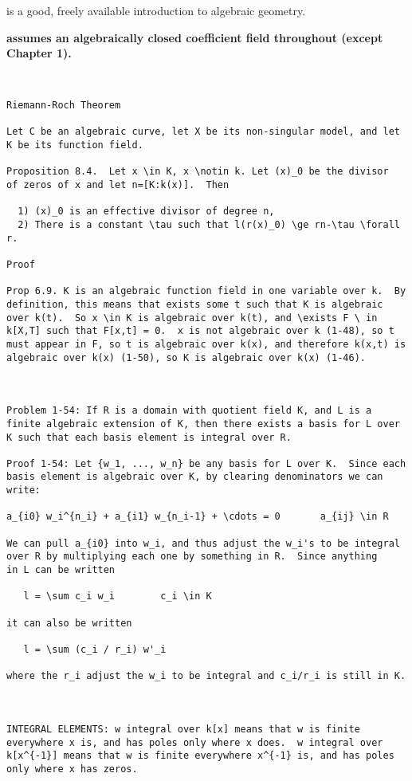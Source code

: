 \vfill\eject
{}

\cite{fulton} is a good, freely available introduction to algebraic geometry.

{\bf \cite{fulton} assumes an algebraically closed coefficient field throughout
(except Chapter 1).}

{\small\begin{verbatim}


Riemann-Roch Theorem

Let C be an algebraic curve, let X be its non-singular model, and let
K be its function field.

Proposition 8.4.  Let x \in K, x \notin k. Let (x)_0 be the divisor
of zeros of x and let n=[K:k(x)].  Then

  1) (x)_0 is an effective divisor of degree n,
  2) There is a constant \tau such that l(r(x)_0) \ge rn-\tau \forall r.

Proof

Prop 6.9. K is an algebraic function field in one variable over k.  By
definition, this means that exists some t such that K is algebraic
over k(t).  So x \in K is algebraic over k(t), and \exists F \ in
k[X,T] such that F[x,t] = 0.  x is not algebraic over k (1-48), so t
must appear in F, so t is algebraic over k(x), and therefore k(x,t) is
algebraic over k(x) (1-50), so K is algebraic over k(x) (1-46).



Problem 1-54: If R is a domain with quotient field K, and L is a
finite algebraic extension of K, then there exists a basis for L over
K such that each basis element is integral over R.

Proof 1-54: Let {w_1, ..., w_n} be any basis for L over K.  Since each
basis element is algebraic over K, by clearing denominators we can
write:

a_{i0} w_i^{n_i} + a_{i1} w_{n_i-1} + \cdots = 0       a_{ij} \in R

We can pull a_{i0} into w_i, and thus adjust the w_i's to be integral
over R by multiplying each one by something in R.  Since anything
in L can be written

   l = \sum c_i w_i        c_i \in K

it can also be written

   l = \sum (c_i / r_i) w'_i

where the r_i adjust the w_i to be integral and c_i/r_i is still in K.



INTEGRAL ELEMENTS: w integral over k[x] means that w is finite
everywhere x is, and has poles only where x does.  w integral over
k[x^{-1}] means that w is finite everywhere x^{-1} is, and has poles
only where x has zeros.


\end{verbatim}}
